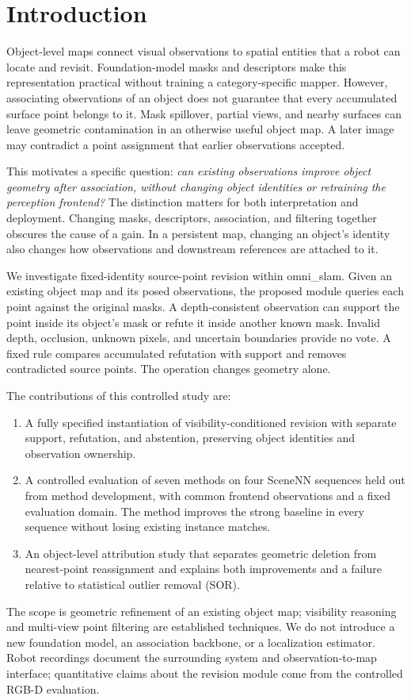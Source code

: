 \section{Introduction}
Object-level maps connect visual observations to spatial entities that a robot can locate and revisit. Foundation-model masks and descriptors make this representation practical without training a category-specific mapper. However, associating observations of an object does not guarantee that every accumulated surface point belongs to it. Mask spillover, partial views, and nearby surfaces can leave geometric contamination in an otherwise useful object map. A later image may contradict a point assignment that earlier observations accepted.

This motivates a specific question: \emph{can existing observations improve object geometry after association, without changing object identities or retraining the perception frontend?} The distinction matters for both interpretation and deployment. Changing masks, descriptors, association, and filtering together obscures the cause of a gain. In a persistent map, changing an object's identity also changes how observations and downstream references are attached to it.

We investigate fixed-identity source-point revision within omni\_slam. Given an existing object map and its posed observations, the proposed module queries each point against the original masks. A depth-consistent observation can support the point inside its object's mask or refute it inside another known mask. Invalid depth, occlusion, unknown pixels, and uncertain boundaries provide no vote. A fixed rule compares accumulated refutation with support and removes contradicted source points. The operation changes geometry alone.

The contributions of this controlled study are:
\begin{enumerate}
\item A fully specified instantiation of visibility-conditioned revision with separate support, refutation, and abstention, preserving object identities and observation ownership.
\item A controlled evaluation of seven methods on four SceneNN sequences held out from method development, with common frontend observations and a fixed evaluation domain. The method improves the strong baseline in every sequence without losing existing instance matches.
\item An object-level attribution study that separates geometric deletion from nearest-point reassignment and explains both improvements and a failure relative to statistical outlier removal (SOR).
\end{enumerate}
The scope is geometric refinement of an existing object map; visibility reasoning and multi-view point filtering are established techniques. We do not introduce a new foundation model, an association backbone, or a localization estimator. Robot recordings document the surrounding system and observation-to-map interface; quantitative claims about the revision module come from the controlled RGB-D evaluation.

